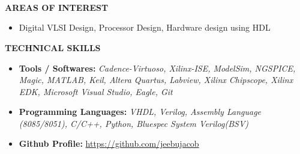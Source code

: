 \documentclass[a4paper,10pt]{article}
\begin{document}
{\qquad \\ \\ \\ \\ \\ \\ \\ \\ \\ \\ \\ \\ \\}

 \colorbox{titleColor}{\parbox{6.5in}{\textbf{AREAS OF INTEREST}}}

 \begin{itemize}
  \setlength{\itemsep}{1pt}

  \item {{  Digital VLSI Design, Processor Design, Hardware design using HDL}}
 \end{itemize}

 \colorbox{titleColor}{\parbox{6.5in}{\textbf{TECHNICAL SKILLS}}}

 \begin{itemize}
  \setlength{\itemsep}{1pt}
  \item \textbf{{Tools / Softwares:}} \textit{Cadence-Virtuoso, Xilinx-ISE, ModelSim, NGSPICE, Magic, MATLAB, Keil, Altera Quartus, Labview, Xilinx Chipscope, Xilinx EDK, Microsoft Visual Studio, Eagle, Git}
  \item \textbf{{Programming Languages:}} \textit{VHDL, Verilog, Assembly Language (8085/8051), C/C++, Python, Bluespec System Verilog(BSV)}
  \item \textbf{{Github Profile:}} \url{https://github.com/jeebujacob}
 \end{itemize}
 
 
\end{document}
